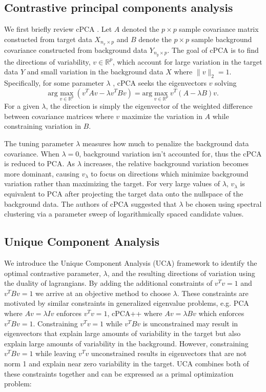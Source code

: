 \documentclass[12pt]{article}
\begin{document}
\subsection{Contrastive principal components analysis}
We first briefly review cPCA \cite{Abid}. Let $A$ denoted the $p\times p$ sample covariance matrix constucted from target data $X_{n_x \times p}$ and $B$ denote the $p\times p$ sample background covariance constructed from background data $Y_{n_y \times p}$. The goal of cPCA is to find the directions of variability, $v \in \mathbb{R}^p$, which account for large variation in the target data $Y$ and small variation in the background data $X$ where $\|v\|_2 = 1$. Specifically, for some parameter $\lambda$ , cPCA seeks the eigenvectors $v$ solving
\[\text{arg}\max_{v \in \mathbb{R}^p}{\left(v^TAv - \lambda v^TBv\right)} = \text{arg}\max_{v \in \mathbb{R}^p}{v^T\left(A - \lambda B\right)v}.\]
For a given $\lambda$, the direction is simply the eigenvector of the weighted difference between covariance matrices where $v$ maximize the variation in $A$ while constraining variation in $B$.

The tuning parameter $\lambda$ measures how much to penalize the background data covariance. When $\lambda = 0$, background variation isn't accounted for, thus the cPCA is reduced to PCA. As $\lambda$ increases, the relative background variation becomes more dominant, causing $v_\lambda$ to focus on directions which minimize background variation rather than maximizing the target. For very large values of $\lambda$, $v_\lambda$ is equivalent to PCA after projecting the target data onto the nullspace of the background data.  The authors of cPCA suggested that $\lambda$ be chosen using spectral clustering via a parameter sweep of logarithmically spaced candidate values.

\subsection{Unique Component Analysis}
We introduce the Unique Component Analysis (UCA) framework to identify the optimal contrastive parameter, $\lambda$, and the resulting directions of variation using the duality of lagrangians.
By adding the additional constraints of $v^T v = 1$ and $v^T Bv = 1$ we arrive at an objective method to choose $\lambda$.
These constraints are motivated by similar constraints in generalized eigenvalue problems, e.g. PCA where $Av = \lambda Iv$ enforces $v^T v = 1$, cPCA++ where $Av = \lambda B v$ which enforces $v^T Bv = 1$. %
Constraining $v^T v = 1$ while $v^T Bv$ is unconstrained may result in eigenvectors that explain large amounts of variability in the target but also explain large amounts of variability in the background.
However, constraining $v^T Bv = 1$ while leaving $v^T v$ unconstrained results in eigenvectors that are not norm 1 and explain near zero variability in the target.
UCA combines both of these constraints together and can be expressed as a primal optimization problem:
\end{document}
